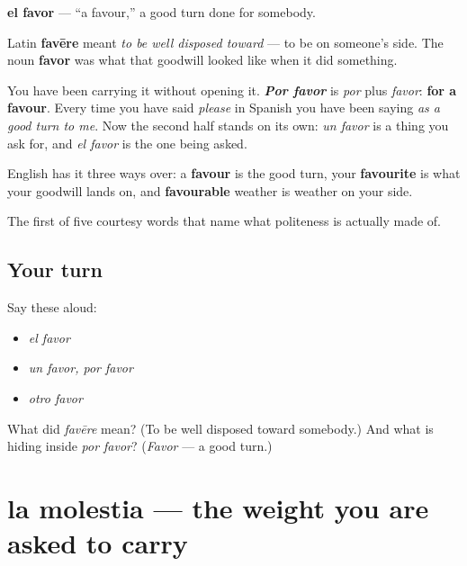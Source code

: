 \begin{cousinweb}
\textbf{el favor} — \textquotedblleft{}a favour,\textquotedblright{} a good turn done for somebody.

Latin \textbf{favēre} meant \emph{to be well disposed toward} — to be on someone's side. The noun \textbf{favor} was what that goodwill looked like when it did something.

You have been carrying it without opening it. \emph{\textbf{Por favor}} is \emph{por} plus \emph{favor}: \textbf{for a favour}. Every time you have said \emph{please} in Spanish you have been saying \emph{as a good turn to me}. Now the second half stands on its own: \emph{un favor} is a thing you ask for, and \emph{el favor} is the one being asked.

English has it three ways over: a \textbf{favour} is the good turn, your \textbf{favourite} is what your goodwill lands on, and \textbf{favourable} weather is weather on your side.
\end{cousinweb}

\begin{grammarlens}[title={What you've built}]
The first of five courtesy words that name what politeness is actually made of.
\end{grammarlens}

\subsection*{Your turn}
Say these aloud:

\begin{itemize}
\raggedright
  \item \emph{el favor}
  \item \emph{un favor, por favor}
  \item \emph{otro favor}
\end{itemize}

\begin{tcolorbox}[breakable,colback=teal!4,colframe=teal!35!black,title={Before you move on}]
What did \emph{favēre} mean? (To be well disposed toward somebody.) And what is hiding inside \emph{por favor}? (\emph{Favor} — a good turn.)
\end{tcolorbox}
\section[la molestia]{la molestia — the weight you are asked to carry}

\label{lesson:ES-C320-molestia}



